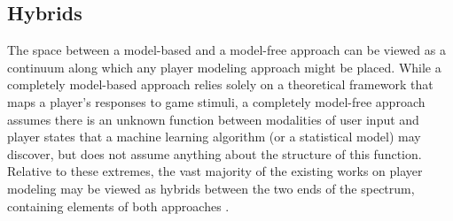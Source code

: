 \subsection{Hybrids}
The space between a model-based and a model-free approach can be viewed as a continuum along which any player modeling approach might be placed. While a completely model-based approach relies solely on a theoretical framework that maps a player’s responses to game stimuli, a completely model-free approach assumes there is an unknown function between modalities of user input and player states that a machine learning algorithm (or a statistical model) may discover, but does not assume anything about the structure of this function. Relative to these extremes, the vast majority of the existing works on player modeling may be viewed as hybrids between the two ends of the spectrum, containing elements of both approaches \citep{YannakakisPlayerModeling2013}.
